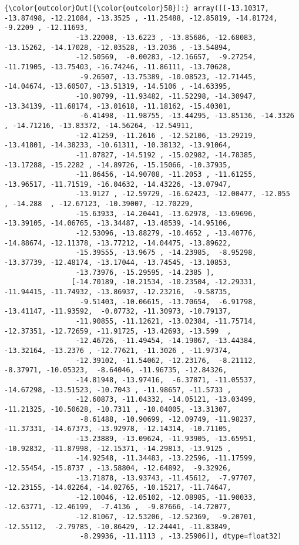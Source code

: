 \documentclass[11pt]{article}
\begin{document}
\begin{Verbatim}[commandchars=\\\{\}]
{\color{outcolor}Out[{\color{outcolor}58}]:} array([[-13.10317, -13.87498, -12.21084, -13.3525 , -11.25488, -12.85819, -14.81724,  -9.2209 , -12.11693,
                 -13.22008, -13.6223 , -13.85686, -12.68083, -13.15262, -14.17028, -12.03528, -13.2036 , -13.54894,
                 -12.50569,  -0.00283, -12.16657,  -9.27254, -11.71905, -13.75403, -16.74246, -11.86111, -13.70628,
                  -9.26507, -13.75389, -10.08523, -12.71445, -14.04674, -13.60507, -13.51319, -14.5106 , -14.63395,
                 -10.90799, -11.93482, -11.52298, -14.30947, -13.34139, -11.68174, -13.01618, -11.18162, -15.40301,
                  -6.41498, -11.98755, -13.44295, -13.85136, -14.3326 , -14.71216, -13.83372, -14.56264, -12.54911,
                 -12.41259, -11.2616 , -12.52106, -13.29219, -13.41801, -14.38233, -10.61311, -10.38132, -13.91064,
                 -11.07827, -14.5192 , -15.02982, -14.78385, -13.17288, -15.2282 , -14.89726, -15.15066, -10.37935,
                 -11.86456, -14.90708, -11.2053 , -11.61255, -13.96517, -11.71519, -16.04632, -14.43226, -13.07947,
                 -13.9127 , -12.59729, -16.62423, -12.00477, -12.055  , -14.288  , -12.67123, -10.39007, -12.70229,
                 -15.63933, -14.20441, -13.62978, -13.69696, -13.39105, -14.06765, -13.34487, -13.48539, -14.95106,
                 -12.53096, -13.88279, -10.4652 , -13.40776, -14.88674, -12.11378, -13.77212, -14.04475, -13.89622,
                 -15.39555, -13.9675 , -14.23985,  -8.95298, -13.37739, -12.48174, -13.17044, -13.74545, -13.10853,
                 -13.73976, -15.29595, -14.2385 ],
                [-14.70189, -10.21534, -10.23504, -12.29331, -11.94415, -11.74932, -13.86937, -12.23216,  -9.58735,
                  -9.51403, -10.06615, -13.70654,  -6.91798, -13.41147, -11.93592,  -0.07732, -11.30973, -10.79137,
                 -11.90855, -11.12621, -13.02384, -11.75714, -12.37351, -12.72659, -11.91725, -13.42693, -13.599  ,
                 -12.46726, -11.49454, -14.19067, -13.44384, -13.32164, -13.2376 , -12.77621, -11.3026 , -11.97374,
                 -12.39102, -11.54062, -12.23176,  -8.21112,  -8.37971, -10.05323,  -8.64046, -11.96735, -12.84326,
                 -14.81948, -13.97416,  -6.37871, -11.05537, -14.67298, -13.51523, -10.7043 , -11.98657, -11.5733 ,
                 -12.60873, -11.04332, -14.05121, -13.03499, -11.21325, -10.50628, -10.7311 , -10.04005, -13.31307,
                  -8.61488, -10.90699, -12.09749, -11.98237, -11.37331, -14.67373, -13.92978, -12.14314, -10.71105,
                 -13.23889, -13.09624, -11.93905, -13.65951, -10.92832, -11.87998, -12.15371, -14.29813, -13.9125 ,
                 -14.92548, -11.34483, -13.22596, -11.17599, -12.55454, -15.8737 , -13.58804, -12.64892,  -9.32926,
                 -13.71878, -13.93743, -11.45612,  -7.97707, -12.23155, -14.02264, -14.02765, -10.15217, -11.74647,
                 -12.10046, -12.05102, -12.08985, -11.90033, -12.63771, -12.46199,  -7.4136 ,  -9.87666, -14.72077,
                 -12.81067, -12.53206, -12.52369,  -9.20701, -12.55112,  -2.79785, -10.86429, -12.24441, -11.83849,
                  -8.29936, -11.1113 , -13.25906]], dtype=float32)
\end{Verbatim}
            
\end{document}
